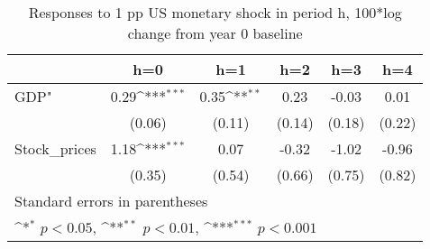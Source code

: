 \begin{table}[htbp]\centering
\def\sym#1{\ifmmode^{#1}\else\(^{#1}\)\fi}
\caption{Responses to 1 pp US monetary shock in period h, 100*log change from year 0 baseline}
\begin{tabular}{l*{5}{c}}
\hline\hline
            &\multicolumn{1}{c}{h=0}&\multicolumn{1}{c}{h=1}&\multicolumn{1}{c}{h=2}&\multicolumn{1}{c}{h=3}&\multicolumn{1}{c}{h=4}\\
\hline
GDP"        &        0.29\sym{***}&        0.35\sym{**} &        0.23         &       -0.03         &        0.01         \\
            &      (0.06)         &      (0.11)         &      (0.14)         &      (0.18)         &      (0.22)         \\
[1em]
Stock\_prices&        1.18\sym{***}&        0.07         &       -0.32         &       -1.02         &       -0.96         \\
            &      (0.35)         &      (0.54)         &      (0.66)         &      (0.75)         &      (0.82)         \\
\hline\hline
\multicolumn{6}{l}{\footnotesize Standard errors in parentheses}\\
\multicolumn{6}{l}{\footnotesize \sym{*} \(p<0.05\), \sym{**} \(p<0.01\), \sym{***} \(p<0.001\)}\\
\end{tabular}
\end{table}
